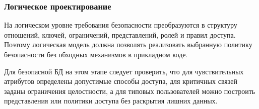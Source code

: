 \subsubsection{Логическое проектирование}

На логическом уровне требования безопасности преобразуются в структуру отношений, ключей, ограничений,
представлений, ролей и правил доступа. Поэтому логическая модель должна позволять реализовать выбранную
политику безопасности без обходных механизмов в прикладном коде.

Для безопасной БД на этом этапе следует проверить, что для чувствительных атрибутов определены допустимые
способы доступа, для критичных связей заданы ограничения целостности, а для типовых пользователей можно
построить представления или политики доступа без раскрытия лишних данных.

